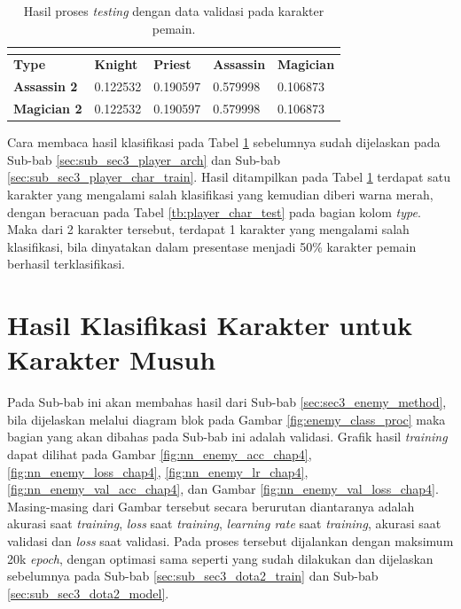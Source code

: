 \begin{longtable}{|l|l|l|l|l|}
	\caption{Hasil proses \textit{testing} dengan data validasi pada karakter pemain.}
	\vspace{1ex}
	\label{tb:player_valid_result}\\
	\hline
	\rowcolor[HTML]{C0C0C0} 
	\textbf{Type} & \textbf{Knight} & \textbf{Priest} & \textbf{Assassin} & \textbf{Magician} \\ \hline
	\textbf{Assassin 2} & 0.122532 & 0.190597 & {\color[HTML]{009901} 0.579998} & 0.106873 \\ \hline
	\textbf{Magician 2} & 0.122532 & 0.190597 & {\color[HTML]{FE0000} 0.579998} & 0.106873 \\ \hline
\end{longtable}
\vspace{1ex}

Cara membaca hasil klasifikasi pada Tabel \ref{tb:player_valid_result} sebelumnya sudah dijelaskan pada Sub-bab \ref{sec:sub_sec3_player_arch} dan Sub-bab \ref{sec:sub_sec3_player_char_train}. Hasil ditampilkan pada Tabel \ref{tb:player_valid_result} terdapat satu karakter yang mengalami salah klasifikasi yang kemudian diberi warna merah, dengan beracuan pada Tabel \ref{tb:player_char_test} pada bagian kolom \textit{type}. Maka dari 2 karakter tersebut, terdapat 1 karakter yang mengalami salah klasifikasi, bila dinyatakan dalam presentase menjadi 50\% karakter pemain berhasil terklasifikasi.
\vspace{1ex}

\section{Hasil Klasifikasi Karakter untuk Karakter Musuh}
\label{sec:sec4_eval_enemy}
\vspace{1ex}

Pada Sub-bab ini akan membahas hasil dari Sub-bab \ref{sec:sec3_enemy_method}, bila dijelaskan melalui diagram blok pada Gambar \ref{fig:enemy_class_proc} maka bagian yang akan dibahas pada Sub-bab ini adalah validasi. Grafik hasil \textit{training} dapat dilihat pada Gambar \ref{fig:nn_enemy_acc_chap4}, \ref{fig:nn_enemy_loss_chap4}, \ref{fig:nn_enemy_lr_chap4}, \ref{fig:nn_enemy_val_acc_chap4}, dan Gambar \ref{fig:nn_enemy_val_loss_chap4}. Masing-masing dari Gambar tersebut secara berurutan diantaranya adalah akurasi saat \textit{training}, \textit{loss} saat \textit{training}, \textit{learning rate} saat \textit{training}, akurasi saat validasi dan \textit{loss} saat validasi. Pada proses tersebut dijalankan dengan maksimum 20k \textit{epoch}, dengan optimasi sama seperti yang sudah dilakukan dan dijelaskan sebelumnya pada Sub-bab \ref{sec:sub_sec3_dota2_train} dan Sub-bab \ref{sec:sub_sec3_dota2_model}.
\vspace{1ex}

